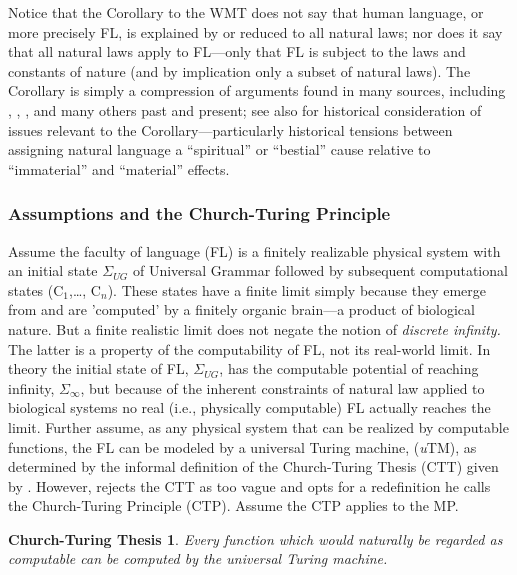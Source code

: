 \documentclass[11pt,twoside]{article}
\begin{document}
Notice that the Corollary to the WMT does not say that human language, or more precisely FL, is explained by or reduced to all natural laws; nor does it say that all natural laws apply to FL---only that FL is subject to the laws and constants of nature (and by implication only a subset of natural laws). The Corollary is simply a compression of arguments found in many sources, including \cite{boeckxpp:2005}, \cite{chomsky86knowledge,chomsky95langnature,chomsky95mp}, \cite{ppuriagereka:2008}, \cite{uriagereka:1998} and many others past and present; see also \cite{formigari:2004} for historical consideration of issues relevant to the Corollary---particularly historical tensions between assigning natural language a ``spiritual'' or ``bestial'' cause relative to ``immaterial'' and ``material'' effects.

\subsubsection{Assumptions and the Church-Turing Principle} 
Assume the faculty of language (FL) is a finitely realizable physical system with an initial state $\Sigma$$_{UG}$ of Universal Grammar followed by subsequent computational states (C$_{1}$,\ldots, C$_{n}$). These states have a finite limit simply because they emerge from and are 'computed' by a finitely organic brain---a product of biological nature. But a finite realistic limit does not negate the notion of \textsl{discrete infinity.} The latter is a property of the computability of FL, not its real-world limit. In theory the initial state of FL, $\Sigma$$_{UG}$, has the computable potential of reaching infinity, $\Sigma$$_{\infty}$, but because of the inherent constraints of natural law applied to biological systems no real (i.e., physically computable) FL actually reaches the limit. Further assume, as any physical system that can be realized by computable functions, the FL can be modeled by a universal Turing machine, (\textsl{u}TM), as determined by the informal definition of the Church-Turing Thesis (CTT) given by \cite{deutsch:1985}. However, \cite{deutsch:1985} rejects the CTT as too vague and opts for a redefinition he calls the Church-Turing Principle (CTP). Assume the CTP applies to the MP.

\newtheorem*{ctthesis}{Church-Turing Thesis}
\begin{ctthesis}
Every function which would naturally be regarded as computable can be computed by the universal Turing machine.
\end{ctthesis}
\end{document}
